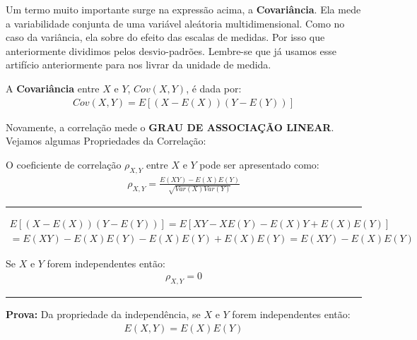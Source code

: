 \documentclass[
  letterpaper,
  DIV=11,
  numbers=noendperiod]{scrartcl}
\begin{document}
Um termo muito importante surge na expressão acima, a
\textbf{Covariância}. Ela mede a variabilidade conjunta de uma variável
aleátoria multidimensional. Como no caso da variância, ela sobre do
efeito das escalas de medidas. Por isso que anteriormente dividimos
pelos desvio-padrões. Lembre-se que já usamos esse artifício
anteriormente para nos livrar da unidade de medida.

\begin{definicao}

A \textbf{Covariância} entre \(X\) e \(Y\), \(Cov(X,Y)\), é dada por:
\[\begin{array}{ccc}
Cov(X,Y)=E[(X-E(X))(Y-E(Y))]
\end{array}\]

\end{definicao}

Novamente, a correlação mede o \textbf{GRAU DE ASSOCIAÇÃO LINEAR}.
Vejamos algumas Propriedades da Correlação:

\begin{teorema}

O coeficiente de correlação \(\rho_{X,Y}\) entre \(X\) e \(Y\) pode ser
apresentado como: \[\begin{array}{ccc}
\rho_{X,Y}=\frac{E(XY)-E(X)E(Y)}{\sqrt{Var(X)Var(Y)}}
\end{array}\]

\begin{center}\rule{0.5\linewidth}{0.5pt}\end{center}


\[\begin{array}{ccc}
E[(X-E(X))(Y-E(Y))]=E[XY-XE(Y)-E(X)Y+E(X)E(Y)]
\\
= E(XY)-E(X)E(Y)-E(X)E(Y)+E(X)E(Y)= E(XY)-E(X)E(Y)
\end{array}\]

\end{teorema}

\begin{teorema}

Se \(X\) e \(Y\) forem independentes então: \[\begin{array}{ccc}
\rho_{X,Y}=0
\end{array}\]

\begin{center}\rule{0.5\linewidth}{0.5pt}\end{center}

\textbf{Prova:} Da propriedade da independência, se \(X\) e \(Y\) forem
independentes então: \[\begin{array}{ccc}
E(X,Y)=E(X)E(Y)
\end{array}\]

\end{teorema}
\end{document}
